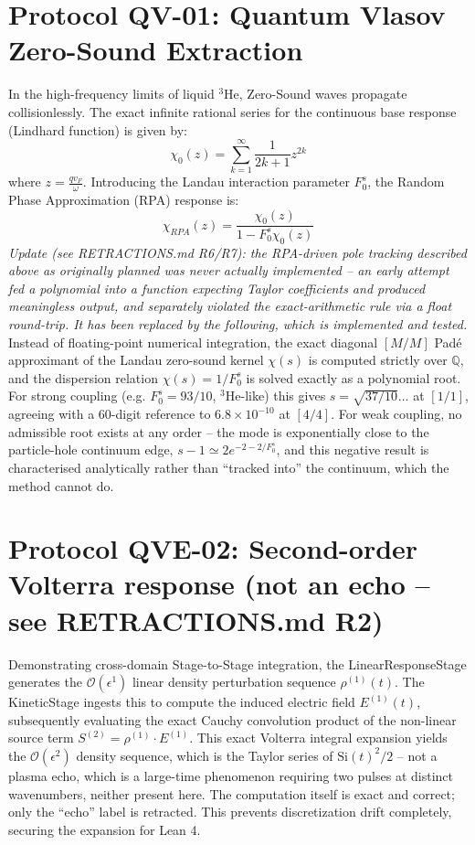 \documentclass[11pt,a4paper]{article}
\begin{document}
\section{Protocol QV-01: Quantum Vlasov Zero-Sound Extraction}
In the high-frequency limits of liquid $^3$He, Zero-Sound waves propagate collisionlessly. The exact infinite rational series for the continuous base response (Lindhard function) is given by:
\begin{equation}
    \chi_0(z) = \sum_{k=1}^{\infty} \frac{1}{2k+1} z^{2k}
\end{equation}
where $z = \frac{q v_F}{\omega}$. Introducing the Landau interaction parameter $F_0^s$, the Random Phase Approximation (RPA) response is:
\begin{equation}
    \chi_{RPA}(z) = \frac{\chi_0(z)}{1 - F_0^s \chi_0(z)}
\end{equation}
\textit{Update (see RETRACTIONS.md R6/R7): the RPA-driven pole tracking described above as originally
planned was never actually implemented -- an early attempt fed a polynomial into a function expecting
Taylor coefficients and produced meaningless output, and separately violated the exact-arithmetic rule
via a float round-trip. It has been replaced by the following, which is implemented and tested.} Instead
of floating-point numerical integration, the exact diagonal $[M/M]$ Pad\'e approximant of the Landau
zero-sound kernel $\chi(s)$ is computed strictly over $\mathbb{Q}$, and the dispersion relation
$\chi(s) = 1/F_0^s$ is solved exactly as a polynomial root. For strong coupling (e.g. $F_0^s = 93/10$,
$^3$He-like) this gives $s = \sqrt{37/10}\ldots$ at $[1/1]$, agreeing with a 60-digit reference to
$6.8\times10^{-10}$ at $[4/4]$. For weak coupling, no admissible root exists at any order -- the mode is
exponentially close to the particle-hole continuum edge, $s - 1 \simeq 2e^{-2-2/F_0^s}$, and this
negative result is characterised analytically rather than ``tracked into'' the continuum, which the
method cannot do.

\section{Protocol QVE-02: Second-order Volterra response (not an echo -- see RETRACTIONS.md R2)}
Demonstrating cross-domain Stage-to-Stage integration, the LinearResponseStage generates the $\mathcal{O}(\epsilon^1)$ linear density perturbation sequence $\rho^{(1)}(t)$. The KineticStage ingests this to compute the induced electric field $E^{(1)}(t)$, subsequently evaluating the exact Cauchy convolution product of the non-linear source term $S^{(2)} = \rho^{(1)} \cdot E^{(1)}$. This exact Volterra integral expansion yields the $\mathcal{O}(\epsilon^2)$ density sequence, which is the Taylor series of $\mathrm{Si}(t)^2/2$ -- not a plasma echo, which is a large-time phenomenon requiring two pulses at distinct wavenumbers, neither present here. The computation itself is exact and correct; only the ``echo'' label is retracted. This prevents discretization drift completely, securing the expansion for Lean 4.
\end{document}
